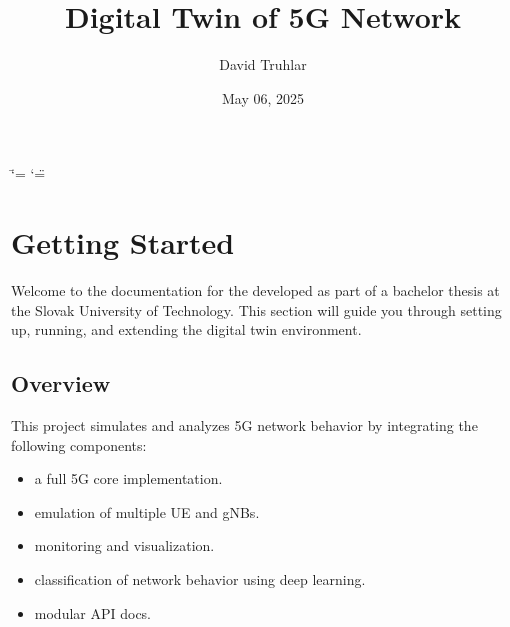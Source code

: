 \documentclass[letterpaper,10pt,english]{sphinxmanual}
\title{Digital Twin of 5G Network}
\date{May 06, 2025}
\author{David Truhlar}
\begin{document}
\ifdefined\shorthandoff
  \ifnum\catcode`\=\string=\active\shorthandoff{=}\fi
  \ifnum\catcode`\"=\active{}\fi
\fi

\pagestyle{empty}
\sphinxmaketitle
\pagestyle{plain}
\sphinxtableofcontents
\pagestyle{normal}
\label{\detokenize{index::doc}}


\sphinxstepscope


\chapter{Getting Started}
\label{\detokenize{getting_started:getting-started}}\label{\detokenize{getting_started::doc}}
\sphinxAtStartPar
Welcome to the documentation for the  developed as part of a bachelor thesis at the Slovak University of Technology.
This section will guide you through setting up, running, and extending the digital twin environment.


\section{Overview}
\label{\detokenize{getting_started:overview}}
\sphinxAtStartPar
This project simulates and analyzes 5G network behavior by integrating the following components:
\begin{itemize}
\item {} 
\sphinxAtStartPar
{} \textendash{} a full 5G core implementation.

\item {} 
\sphinxAtStartPar
{} \textendash{} emulation of multiple UE and gNBs.

\item {} 
\sphinxAtStartPar
{} \textendash{} monitoring and visualization.

\item {} 
\sphinxAtStartPar
{} \textendash{} classification of network behavior using deep learning.

\item {} 
\sphinxAtStartPar
{} \textendash{} modular API docs.

\end{itemize}
\end{document}

